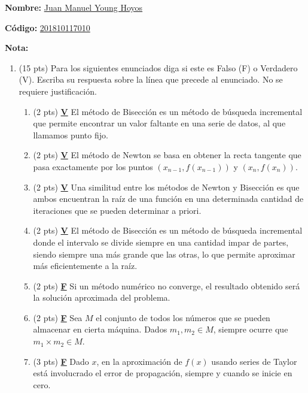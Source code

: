 \documentclass{exam}
\begin{document}
\begin{center}
\end{center}

\textbf{Nombre:} \underline{Juan Manuel Young Hoyos} \enspace\hrulefill

\textbf{Código:} \underline{201810117010} \enspace\hrulefill

\textbf{Nota:\enspace\hrulefill}

\begin{enumerate}

    \section*{Falso o Verdadero}

    \item (15 pts) Para los siguientes enunciados diga si este es Falso (F) o Verdadero (V). Escriba su respuesta sobre la línea que precede al enunciado. No se requiere justificación.
    
    \begin{enumerate}
        \item (2 pts) \textbf{\underline{V}} El método de Bisección es un método de búsqueda incremental que permite encontrar un valor faltante en una serie de datos, al que llamamos punto fijo.
        \item (2 pts) \textbf{\underline{V}} El método de Newton se basa en obtener la recta tangente que pasa exactamente por los puntos $ (x_{n-1}, f(x_{n-1})) $ y $ (x_n, f(x_n)) $.
        \item (2 pts) \textbf{\underline{V}} Una similitud entre los métodos de Newton y Bisección es que ambos encuentran la raíz de una función en una determinada cantidad de iteraciones que se pueden determinar a priori.
        \item (2 pts) \textbf{\underline{V}} El método de Bisección es un método de búsqueda incremental donde el intervalo se divide siempre en una cantidad impar de partes, siendo siempre una más grande que las otras, lo que permite aproximar más eficientemente a la raíz.
        \item (2 pts) \textbf{\underline{F}} Si un método numérico no converge, el resultado obtenido será la solución aproximada del problema.
        \item (2 pts) \textbf{\underline{F}} Sea $M$ el conjunto de todos los números que se pueden almacenar en cierta máquina. Dados $m_1, m_2 \in M$, siempre ocurre que $m_1 \times m_2 \in M$.
        \item (3 pts) \textbf{\underline{F}} Dado $x$, en la aproximación de $f(x)$ usando series de Taylor está involucrado el error de propagación, siempre y cuando se inicie en cero.
    \end{enumerate}


\end{enumerate}
\end{document}
